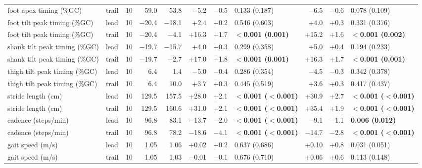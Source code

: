 \begin{adjustbox}{max width=\textwidth}
{\begin{tabular}{llrrrrrlrrl}
foot apex timing (\%GC) & trail & 10 & 59.0 & 53.8 & $-$5.2 & $-$0.5 & 0.133 (0.187) & $-$6.5 & $-$0.6 & 0.078 (0.109) \\
foot tilt peak timing (\%GC) & lead & 10 & $-$20.4 & $-$18.1 & +2.4 & +0.2 & 0.546 (0.603) & +4.0 & +0.3 & 0.331 (0.376) \\
foot tilt peak timing (\%GC) & trail & 10 & $-$20.4 & $-$4.1 & +16.3 & +1.7 & \textbf{$<$0.001 (0.001)} & +15.2 & +1.6 & \textbf{$<$0.001 (0.002)} \\
shank tilt peak timing (\%GC) & lead & 10 & $-$19.7 & $-$15.7 & +4.0 & +0.3 & 0.299 (0.358) & +5.0 & +0.4 & 0.194 (0.233) \\
shank tilt peak timing (\%GC) & trail & 10 & $-$19.7 & $-$2.7 & +17.0 & +1.8 & \textbf{$<$0.001 (0.001)} & +16.3 & +1.7 & \textbf{$<$0.001 (0.001)} \\
thigh tilt peak timing (\%GC) & lead & 10 & 6.4 & 1.4 & $-$5.0 & $-$0.4 & 0.286 (0.354) & $-$4.5 & $-$0.3 & 0.342 (0.378) \\
thigh tilt peak timing (\%GC) & trail & 10 & 6.4 & 10.0 & +3.7 & +0.3 & 0.445 (0.519) & +3.6 & +0.3 & 0.417 (0.437) \\
stride length (cm) & lead & 10 & 129.5 & 157.5 & +28.0 & +2.1 & \textbf{$<$0.001 ($<$0.001)} & +30.9 & +2.7 & \textbf{$<$0.001 ($<$0.001)} \\
stride length (cm) & trail & 10 & 129.5 & 160.6 & +31.0 & +2.1 & \textbf{$<$0.001 ($<$0.001)} & +35.4 & +1.9 & \textbf{$<$0.001 ($<$0.001)} \\
cadence (steps/min) & lead & 10 & 96.8 & 83.1 & $-$13.7 & $-$2.0 & \textbf{$<$0.001 ($<$0.001)} & $-$9.1 & $-$1.1 & \textbf{0.006 (0.012)} \\
cadence (steps/min) & trail & 10 & 96.8 & 78.2 & $-$18.6 & $-$4.1 & \textbf{$<$0.001 ($<$0.001)} & $-$14.7 & $-$2.8 & \textbf{$<$0.001 ($<$0.001)} \\
gait speed (m/s) & lead & 10 & 1.05 & 1.06 & +0.02 & +0.2 & 0.637 (0.686) & +0.10 & +0.8 & 0.031 (0.051) \\
gait speed (m/s) & trail & 10 & 1.05 & 1.03 & $-$0.01 & $-$0.1 & 0.676 (0.710) & +0.06 & +0.6 & 0.113 (0.148) \\
\bottomrule
\end{tabular}
}
\end{adjustbox}
